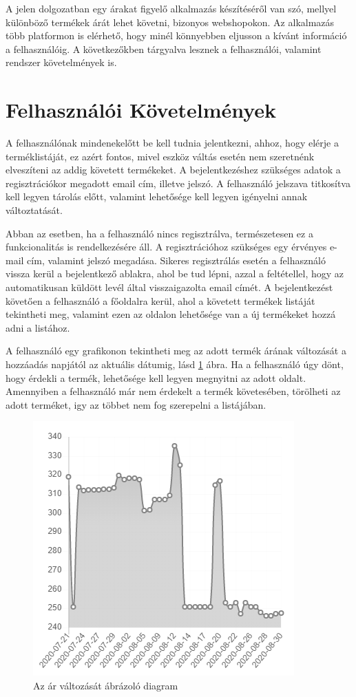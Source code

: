 A jelen dolgozatban egy árakat figyelő alkalmazás készítéséről van szó, mellyel különböző termékek árát lehet követni, bizonyos webshopokon. Az alkalmazás több platformon is elérhető, hogy minél könnyebben eljusson a kívánt információ a felhasználóig. A következőkben tárgyalva lesznek a felhasználói, valamint rendszer követelmények is.

\section{Felhasználói Követelmények}

A felhasználónak mindenekelőtt be kell tudnia jelentkezni, ahhoz, hogy elérje a terméklistáját, ez azért fontos, mivel eszköz váltás esetén nem szeretnénk elveszíteni az addig követett termékeket. A bejelentkezéshez szükséges adatok a regisztrációkor megadott email cím, illetve jelszó. A felhasználó jelszava titkosítva kell legyen tárolás előtt, valamint lehetősége kell legyen igényelni annak változtatását.

Abban az esetben, ha a felhasználó nincs regisztrálva, természetesen ez a funkcionalitás is rendelkezésére áll. A regisztrációhoz szükséges egy érvényes e-mail cím, valamint jelszó megadása. Sikeres regisztrálás esetén a felhasználó vissza kerül a bejelentkező ablakra, ahol be tud lépni, azzal a feltétellel, hogy az automatikusan küldött levél által visszaigazolta email címét. A bejelentkezést követően a felhasználó a főoldalra kerül, ahol a követett termékek listáját tekintheti meg, valamint ezen az oldalon lehetősége van a új termékeket hozzá adni a listához.

A felhasználó egy grafikonon tekintheti meg az adott termék árának változását a hozzáadás napjától az aktuális dátumig, lásd \ref{fig:chart_example} ábra. Ha a felhasználó úgy dönt, hogy érdekli a termék, lehetősége kell legyen megnyitni az adott oldalt. Amennyiben a felhasználó már nem érdekelt a termék követesében, törölheti az adott terméket, igy az többet nem fog szerepelni a listájában.

\begin{figure}[H]
    \centering
    \includegraphics[scale=1]{figures/images/chart_example.png}
    \caption{Az ár változását ábrázoló diagram}
    \label{fig:chart_example}
\end{figure}

